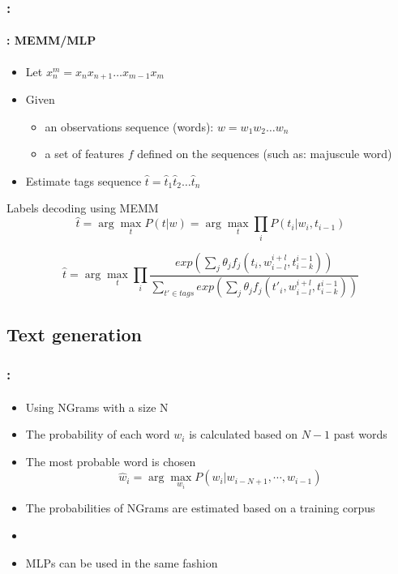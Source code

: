 \documentclass[xcolor=table]{beamer}
\begin{document}
\begin{frame}
	\frametitle{\insertshortsubtitle: \insertsection}
	\framesubtitle{\insertsubsection: MEMM/MLP}
	
	\begin{itemize}
		\item Let $x_{n}^{m} = x_n x_{n+1} \ldots x_{m-1} x_m$
		\item Given 
		\begin{itemize}
			\item an observations sequence (words): $w = w_1 w_2 \ldots w_n$
			\item a set of features $f$ defined on the sequences (such as: majuscule word)
		\end{itemize}
		\item Estimate tags sequence $\hat{t} = \hat{t}_1 \hat{t}_2 \ldots \hat{t}_n$
	\end{itemize}
	
	\begin{block}{Labels decoding using MEMM}
		\[
		\hat{t} = \arg\max\limits_t P(t | w) = \arg\max\limits_t \prod\limits_{i}  P(t_i | w_i, t_{i-1})
		\]
		
		\[
		\hat{t} = \arg\max\limits_t \prod\limits_{i}  
		\frac{exp\left(\sum_j \theta_j f_j(t_i, w_{i-l}^{i+l}, t_{i-k}^{i-1})\right)}%
		{\sum_{t' \in tags} exp\left(\sum_j \theta_j f_j(t'_i, w_{i-l}^{i+l}, t_{i-k}^{i-1})\right)}
		\]
	\end{block}
	
\end{frame}


\subsection{Text generation}

\begin{frame}
	\frametitle{\insertshortsubtitle: \insertsection}
	\framesubtitle{\insertsubsection}
	
	\begin{itemize}
		\item Using NGrams with a size N
		\item The probability of each word $ w_i $ is calculated based on $N-1$ past words
		\item The most probable word is chosen
		\[\hat{w}_i = \arg\max\limits_{w_i} P(w_i | w_{i-N+1}, \cdots, w_{i-1})\]
		\item The probabilities of NGrams are estimated based on a training corpus
		\item {}
		\item MLPs can be used in the same fashion
	\end{itemize}
	
\end{frame}
\end{document}
